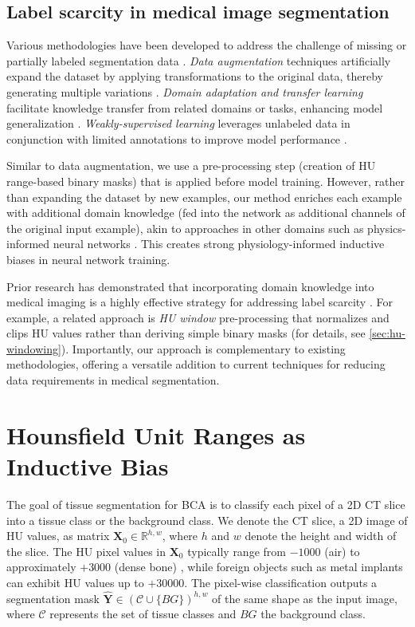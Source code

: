 \documentclass[conference]{IEEEtran}
\let\bm\mathbf
\begin{document}
\subsection{Label scarcity in medical image segmentation} \label{sec:related-work-labels}
Various methodologies have been developed to address the challenge of missing or partially labeled segmentation data \cite{simmler_survey_2021}.
\emph{Data augmentation} techniques artificially expand the dataset by applying transformations to the original data, thereby generating multiple variations \cite{gardner_realistic_2023, goceri_medical_2023, tuggener_real_2024, lim2025transraunet}.
\emph{Domain adaptation and transfer learning} facilitate knowledge transfer from related domains or tasks, enhancing model generalization \cite{amirian2021prepnet, guan_domain_2022, karimi_transfer_2021, yan2024comprehensive}.
\emph{Weakly-supervised learning} leverages unlabeled data in conjunction with limited annotations to improve model performance \cite{sager_unsupervised_2022, felfeliyan_self-supervised-rcnn_2023}.

Similar to data augmentation, we use a pre-processing step (creation of HU range-based binary masks) that is applied before model training. 
However, rather than expanding the dataset by new examples, our method enriches each example with additional domain knowledge  (fed into the network as additional channels of the original input example), akin to approaches in other domains such as physics-informed neural networks \cite{cuomo_scientific_2022}. This creates strong physiology-informed inductive biases in neural network training.

Prior research has demonstrated that incorporating domain knowledge into medical imaging is a highly effective strategy for addressing label scarcity \cite{sager_unsupervised_2022}.
For example, a related approach is \emph{HU window} pre-processing \cite{kloenne_domain-specific_2020,steybe2022automated} that normalizes and clips HU values rather than deriving simple binary masks (for details, see \cref{sec:hu-windowing}).
Importantly, our approach is complementary to existing methodologies, offering a versatile addition to current techniques for reducing data requirements in medical segmentation.


\section{Hounsfield Unit Ranges as Inductive Bias}
The goal of tissue segmentation for BCA is to classify each pixel of a 2D CT slice into a tissue class or the background class.
We denote the CT slice, a 2D image of HU values, as matrix $\bm{X}_0 \in \mathbb{R}^{h, w}$, where $h$ and $w$ denote the height and width of the slice.
The HU pixel values in $\bm{X}_0$ typically range from $-\num{1000}$ (air) to approximately $+\num{3000}$ (dense bone) \cite{bibb2014medical}, while foreign objects such as metal implants can exhibit HU values up to $+\num{30000}$.
The pixel-wise classification outputs a segmentation mask $\hat{\bm{Y}} \in (\mathcal{C} \cup \{ BG \})^{h , w}$ of the same shape as the input image, where $\mathcal{C}$ represents the set of tissue classes and $BG$ the background class.
\end{document}
